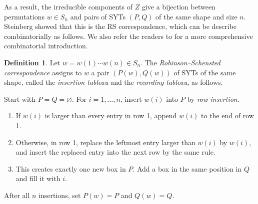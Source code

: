 \documentclass[12pt,a4paper]{article}
\theoremstyle{plain}
\theoremstyle{definition}
\newtheorem{definition}[thm]{Definition}
\theoremstyle{remark}
\begin{document}
    As a result, the irreducible components of $Z$ give a bijection between permutations $w\in S_n$ and pairs of SYTs $(P,Q)$ of the same shape and size $n$. Steinberg \cite{steinberg1988occurrence} showed that this is the RS correspondence, which can be describe combinatorially as follows. We also refer the readers to \cite{stanley2023enumerative} for a more comprehensive combinatorial introduction.

    \begin{definition}
        Let $w=w(1)\cdots w(n)\in S_n$. The
        \textit{Robinson--Schensted correspondence} assigns to $w$ a pair $(P(w),Q(w))$ of SYTs of the same shape, called the \textit{insertion tableau} and the \textit{recording tableau}, as follows.
        
        Start with $P=Q=\varnothing$. For $i=1,\ldots,n$, insert $w(i)$
        into $P$ by \emph{row insertion}.
        \begin{enumerate}
            \item If $w(i)$ is larger than every entry in row 1, append $w(i)$ to the end of row 1.
            \item Otherwise, in row 1, replace the leftmost entry larger than $w(i)$ by $w(i)$, and insert the replaced entry
            into the next row by the same rule.
            \item This creates exactly one new box in $P$. Add a box in the same position in $Q$ and fill it with $i$.
        \end{enumerate}
        After all $n$ insertions, set $P(w)=P$ and $Q(w)=Q$.
    \end{definition}
\end{document}
